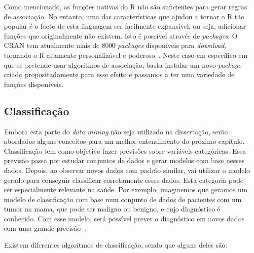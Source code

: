 Como mencionado, as funções nativas do R não são suficientes para gerar regras de associação. No entanto, uma das características que ajudou a tornar o R tão popular é o facto de esta linguagem ser facilmente expansível, ou seja, adicionar funções que originalmente não existem. Isto é possível através de \textit{packages}.
O \ac{CRAN} tem atualmente mais de 8000 \textit{packages} disponíveis para \textit{download}, tornando o R altamente personalizável e poderoso~\cite{cran}.
Neste caso em específico em que se pretende usar algoritmos de associação, basta instalar um novo \textit{package} criado propositadamente para esse efeito e passamos a ter uma variedade de funções disponíveis. 

\subsection{Classificação}

Embora esta parte do \textit{data mining} não seja utilizado na dissertação, serão abordados alguns conceitos para um melhor entendimento do próximo capítulo.
Classificação tem como objetivo fazer previsões sobre variáveis categóricas. Essa previsão passa por estudar conjuntos de dados e gerar modelos com base nesses dados. Depois, ao observar novos dados com padrão similar, vai utilizar o modelo gerado para conseguir classificar corretamente esses dados. Esta categoria pode ser especialmente relevante na saúde. Por exemplo, imaginemos que geramos um modelo de classificação com base num conjunto de dados de pacientes com um tumor na mama, que pode ser maligno ou benigno, e cujo diagnóstico é conhecido. Com esse modelo, será possível prever o diagnóstico em novos dados com uma grande precisão~\cite{cancerpred}.

Existem diferentes algoritmos de classificação, sendo que alguns deles são:

